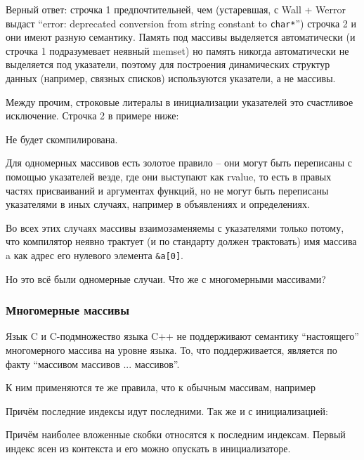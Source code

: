 \documentclass[a4paper,12pt,oneside]{article}
\begin{document}
Верный ответ: строчка 1 предпочтительней, чем (устаревшая, с Wall + Werror выдаст ``error: deprecated conversion from string constant to \lstinline!char*!'') строчка 2 и они имеют разную семантику. Память под массивы выделяется автоматически (и строчка 1 подразумевает неявный memset) но память никогда автоматически не выделяется под указатели, поэтому для построения динамических структур данных (например, связных списков) используются указатели, а не массивы.

Между прочим, строковые литералы в инициализации указателей это счастливое исключение. Строчка 2 в примере ниже:



Не будет скомпилирована.

Для одномерных массивов есть золотое правило – они могут быть переписаны с помощью указателей везде, где они выступают как rvalue, то есть в правых частях присваиваний и аргументах функций, но не могут быть переписаны указателями в иных случаях, например в объявлениях и определениях.



Во всех этих случаях массивы взаимозаменяемы с указателями только потому, что компилятор неявно трактует (и по стандарту должен трактовать) имя массива a как адрес его нулевого элемента \lstinline!&a[0]!. 

Но это всё были одномерные случаи. Что же с многомерными массивами?

\subsubsection{Многомерные массивы}

Язык C и C-подмножество языка C++ не поддерживают семантику ``настоящего'' многомерного массива на уровне языка.  То, что поддерживается, является по факту ``массивом массивов ... массивов''. 

К ним применяются те же правила, что к обычным массивам, например



Причём последние индексы идут последними. Так же и с инициализацией:



Причём наиболее вложенные скобки относятся к последним индексам. Первый индекс ясен из контекста и его можно опускать в инициализаторе.
\end{document}
